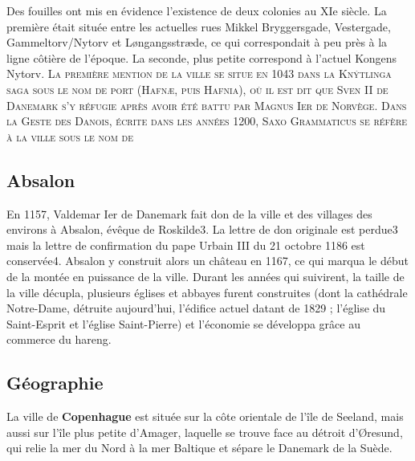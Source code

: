 \documentclass[a4paper,10pt,openany]{memoir}
\begin{document}
Des fouilles ont mis en évidence l'existence de deux colonies au XIe siècle. La première était située
entre les actuelles rues Mikkel Bryggersgade, Vestergade, Gammeltorv/Nytorv et Løngangsstræde, ce qui 
correspondait à peu près à la ligne côtière de l'époque. La seconde, plus petite correspond à l'actuel 
Kongens Nytorv.
\textsc{
La première mention de la ville se situe en 1043 dans la Knýtlinga saga sous le nom de port (Hafnæ, puis 
Hafnia), où il est dit que Sven II de Danemark s'y réfugie après avoir été battu par Magnus Ier de Norvège.
Dans la Geste des Danois, écrite dans les années 1200, Saxo Grammaticus se réfère à la ville sous le nom de }
\nopagebreak
\subsection*{Absalon}
En 1157, Valdemar Ier de Danemark fait don de la ville et des villages des environs à Absalon, évêque de
Roskilde3. La lettre de don originale est perdue3 mais la lettre de confirmation du pape Urbain III du 21 
octobre 1186 est conservée4. Absalon y construit alors un château en 1167, ce qui marqua le début de la 
montée en puissance de la ville. Durant les années qui suivirent, la taille de la ville décupla, plusieurs
églises et abbayes furent construites (dont la cathédrale Notre-Dame, détruite aujourd'hui, l'édifice actuel
datant de 1829 ; l'église du Saint-Esprit et l'église Saint-Pierre) et l'économie se développa grâce au 
commerce du hareng.

\subsection*{Géographie}
La ville de \textbf{Copenhague} est située sur la côte orientale de l'île de Seeland, mais aussi sur l'île plus 
petite d'Amager, laquelle se trouve face au détroit d'Øresund, qui relie la mer du Nord à la mer Baltique
et sépare le Danemark de la Suède.
\end{document}
